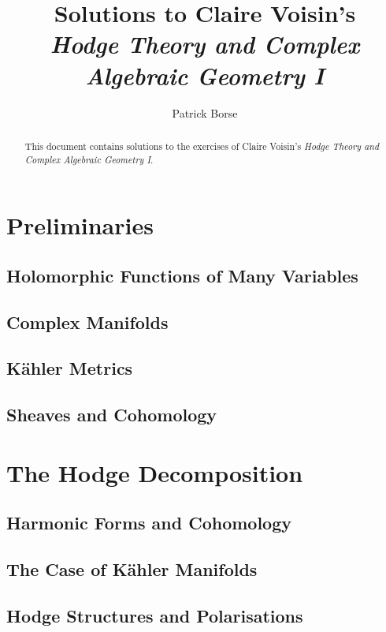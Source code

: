 \documentclass[oneside]{amsbook}
\title{Solutions to Claire Voisin's\\ \emph{Hodge Theory and Complex Algebraic Geometry I}}
\author{Patrick Borse}
\begin{document}
\begin{abstract}
This document contains solutions to the exercises of Claire Voisin's \emph{Hodge Theory and Complex Algebraic Geometry I}.
\end{abstract}

\maketitle

\tableofcontents

\part{Preliminaries}
\chapter{Holomorphic Functions of Many Variables}


\chapter{Complex Manifolds}


\chapter{Kähler Metrics}


\chapter{Sheaves and Cohomology}


\part{The Hodge Decomposition}
\chapter{Harmonic Forms and Cohomology}


\chapter{The Case of Kähler Manifolds}


\chapter{Hodge Structures and Polarisations}

\end{document}
